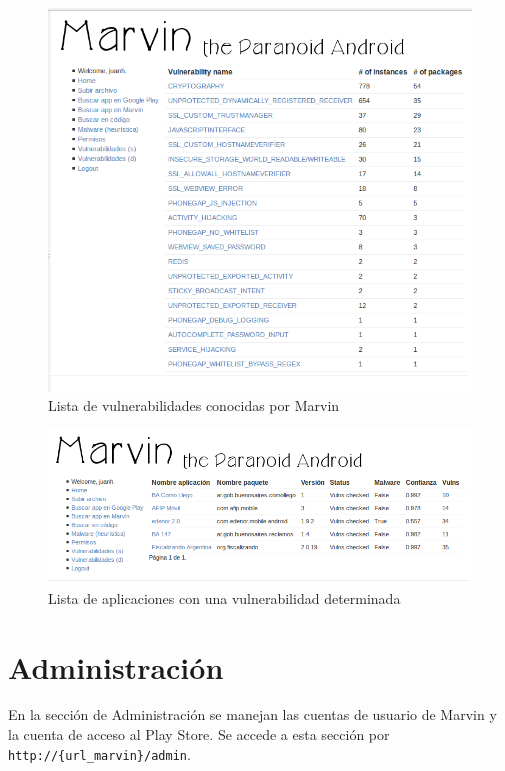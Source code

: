 \documentclass[11pt]{article}
\begin{document}
\begin{figure}[H]
\begin{center}
\includegraphics[width=\textwidth]{graphics/marvin_vulns.png}
\caption{Lista de vulnerabilidades conocidas por Marvin} \label{vulns}
\end{center}
\end{figure}

\begin{figure}[H]
\begin{center}
\includegraphics[width=\textwidth]{graphics/marvin_vulns2.png}
\caption{Lista de aplicaciones con una vulnerabilidad determinada} \label{vulns2}
\end{center}
\end{figure}

\section{Administración}
En la sección de Administración se manejan las cuentas de usuario de Marvin y la cuenta de acceso al Play Store. Se accede a esta sección por \texttt{http://\{url\_marvin\}/admin}.
\end{document}
